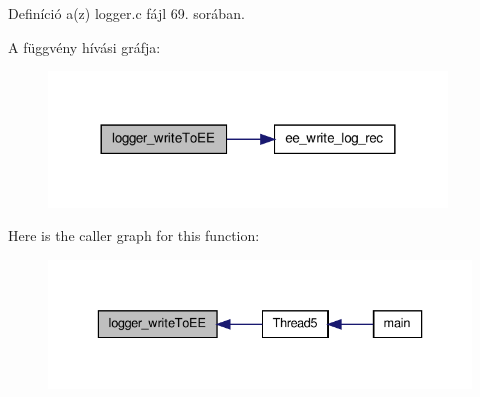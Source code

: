 Definíció a(z) logger.\-c fájl 69. sorában.



A függvény hívási gráfja\-:
\nopagebreak
\begin{figure}[H]
\begin{center}
\leavevmode
\includegraphics[width=300pt]{logger_8c_a8f9e5decfda36c73889dcb1ebd212022_cgraph}
\end{center}
\end{figure}




Here is the caller graph for this function\-:
\nopagebreak
\begin{figure}[H]
\begin{center}
\leavevmode
\includegraphics[width=336pt]{logger_8c_a8f9e5decfda36c73889dcb1ebd212022_icgraph}
\end{center}
\end{figure}


